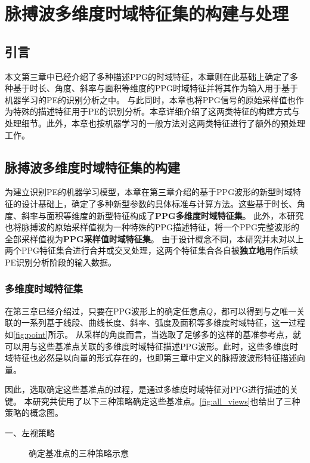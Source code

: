 \chapter{脉搏波多维度时域特征集的构建与处理}
\section{引言}
本文第三章中已经介绍了多种描述PPG的时域特征，本章则在此基础上确定了多种基于时长、角度、斜率与面积等维度的PPG时域特征并将其作为输入用于基于机器学习的PE的识别分析之中。
与此同时，本章也将PPG信号的原始采样值也作为特殊的描述特征用于PE的识别分析。本章详细介绍了这两类特征的构建方式与处理细节。此外，本章也按机器学习的一般方法对这两类特征进行了额外的预处理工作。

\section{脉搏波多维度时域特征集的构建}
为建立识别PE的机器学习模型，本章在第三章介绍的基于PPG波形的新型时域特征的设计基础上，确定了多种新型参数的具体标准与计算方法。这些基于时长、角度、斜率与面积等维度的新型特征构成了\textbf{PPG多维度时域特征集}。
此外，本研究也将脉搏波的原始采样值视为一种特殊的PPG描述特征，将一个PPG完整波形的全部采样值视为\textbf{PPG采样值时域特征集}。
由于设计概念不同，本研究并未对以上两个PPG特征集合进行合并或交叉处理，这两个特征集合各自被\textbf{独立地}用作后续PE识别分析阶段的输入数据。

\subsection{多维度时域特征集}

在第三章已经介绍过，只要在PPG波形上的确定任意点$Q$，都可以得到与之唯一关联的一系列基于线段、曲线长度、斜率、弧度及面积等多维度时域特征，这一过程如\autoref{fig:point}所示。
从采样的角度而言，当选取了足够多的这样的基准参考点，就可以用与这些基准点关联的多维度时域特征描述PPG波形。此时，这些多维度时域特征也必然是以向量的形式存在的，也即第三章中定义的脉搏波波形特征描述向量。

因此，选取确定这些基准点的过程，是通过多维度时域特征对PPG进行描述的关键。
本研究共使用了以下三种策略确定这些基准点。\autoref{fig:all_views}也给出了三种策略的概念图。

一、左视策略

\begin{figure}[h]
  \centering
  \quad
  \quad
  \caption{\label{fig:all_views}确定基准点的三种策略示意}
\end{figure}

